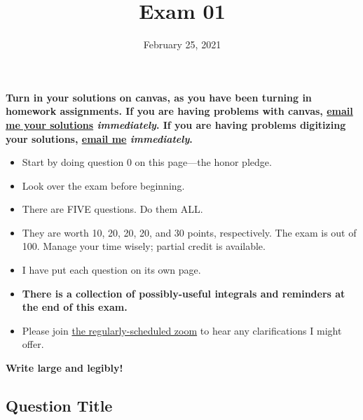 
\providecommand{\repositoryInformationSetup}{} %
\repositoryInformationSetup


\pointsinleftmargin 
{}
\extrawidth{-0.5in}


\title{Exam 01}
\contact
\date{February 25, 2021}

\maketitle

{\bf Turn in your solutions on canvas, as you have been turning in homework assignments.  If you are having problems with canvas, \href{mailto:evanb@umd.edu}{email me your solutions} \emph{immediately}.  If you are having problems digitizing your solutions, \href{mailto:evanb@umd.edu}{email me} \emph{immediately}.}

\begin{itemize}
	\item	Start by doing question 0 on this page---the honor pledge.
	\item	Look over the exam before beginning.
	\item	There are FIVE questions.  Do them ALL.
	\item	They are worth 10, 20, 20, 20, and 30 points, respectively.  The exam is out of 100.  Manage your time wisely; partial credit is available.
	\item	I have put each question on its own page.  
	\item	{\bf There is a collection of possibly-useful integrals and reminders at the end of this exam.}
	\item	Please join \href{https://umd.zoom.us/j/96037839765?pwd=c0FYMEVteHlKbkJNSU1JUko3RHZ5QT09}{the regularly-scheduled zoom} to hear any clarifications I might offer.
\end{itemize}

{\bf Write large and legibly!}


\begin{questions}
	\clearpage
	\section*{Question Title}
	
\end{questions}

\ifprintanswers
\else
	\clearpage
	
\fi

